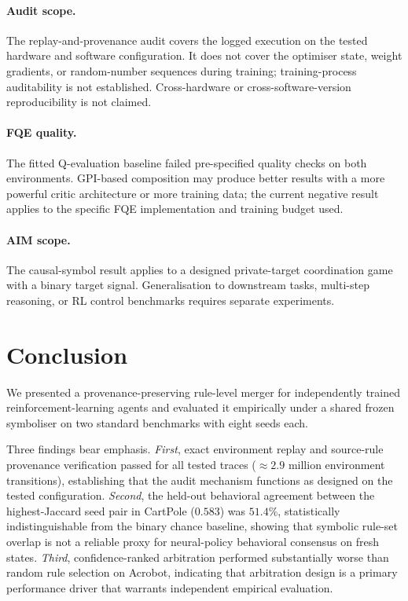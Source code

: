 \documentclass[12pt]{article}
\begin{document}
\paragraph{Audit scope.}
The replay-and-provenance audit covers the logged execution on the tested
hardware and software configuration.
It does not cover the optimiser state, weight gradients, or random-number
sequences during training; training-process auditability is not established.
Cross-hardware or cross-software-version reproducibility is not claimed.

\paragraph{FQE quality.}
The fitted Q-evaluation baseline failed pre-specified quality checks
on both environments.
GPI-based composition may produce better results with a more powerful
critic architecture or more training data; the current negative result
applies to the specific FQE implementation and training budget used.

\paragraph{AIM scope.}
The causal-symbol result applies to a designed private-target coordination
game with a binary target signal.
Generalisation to downstream tasks, multi-step reasoning, or RL
control benchmarks requires separate experiments.

\section{Conclusion}
\label{sec:conclusion}

We presented a provenance-preserving rule-level merger for independently
trained reinforcement-learning agents and evaluated it empirically under
a shared frozen symboliser on two standard benchmarks with eight seeds each.

Three findings bear emphasis.
\emph{First}, exact environment replay and source-rule provenance
verification passed for all tested traces (${\approx}2.9$ million
environment transitions), establishing that the audit mechanism functions
as designed on the tested configuration.
\emph{Second}, the held-out behavioral agreement between the
highest-Jaccard seed pair in CartPole ($0.583$) was $51.4\%$, statistically
indistinguishable from the binary chance baseline, showing that symbolic
rule-set overlap is not a reliable proxy for neural-policy behavioral
consensus on fresh states.
\emph{Third}, confidence-ranked arbitration performed substantially worse
than random rule selection on Acrobot, indicating that arbitration design
is a primary performance driver that warrants independent empirical evaluation.
\end{document}

